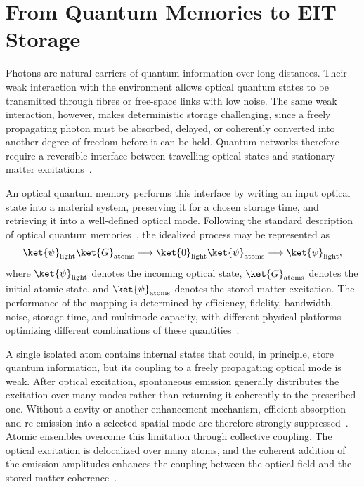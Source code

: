 \section{From Quantum Memories to EIT Storage}
\label{sec:from_quantum_memories_to_eit}

Photons are natural carriers of quantum information over long distances. Their weak interaction with the environment allows optical quantum states to be transmitted through fibres or free-space links with low noise. The same weak interaction, however, makes deterministic storage challenging, since a freely propagating photon must be absorbed, delayed, or coherently converted into another degree of freedom before it can be held. Quantum networks therefore require a reversible interface between travelling optical states and stationary matter excitations~\cite{AWAVQMitCoSR_Rodriguez_,Oqmboeit_MaEtAl_2017}.

An optical quantum memory performs this interface by writing an input optical state into a material system, preserving it for a chosen storage time, and retrieving it into a well-defined optical mode. Following the standard description of optical quantum memories~\cite{AWAVQMitCoSR_Rodriguez_,Oqmboeit_MaEtAl_2017}, the idealized process may be represented as
\begin{equation}
    \ket{\psi}_{\mathrm{light}}
    \ket{G}_{\mathrm{atoms}}
    \longrightarrow
    \ket{0}_{\mathrm{light}}
    \ket{\psi}_{\mathrm{atoms}}
    \longrightarrow
    \ket{\psi}_{\mathrm{light}},
    \label{eq:quantum_memory_mapping}
\end{equation}
where $\ket{\psi}_{\mathrm{light}}$ denotes the incoming optical state, $\ket{G}_{\mathrm{atoms}}$ denotes the initial atomic state, and $\ket{\psi}_{\mathrm{atoms}}$ denotes the stored matter excitation. The performance of the mapping is determined by efficiency, fidelity, bandwidth, noise, storage time, and multimode capacity, with different physical platforms optimizing different combinations of these quantities~\cite{AWAVQMitCoSR_Rodriguez_,Oqmboeit_MaEtAl_2017}.

A single isolated atom contains internal states that could, in principle, store quantum information, but its coupling to a freely propagating optical mode is weak. After optical excitation, spontaneous emission generally distributes the excitation over many modes rather than returning it coherently to the prescribed one. Without a cavity or another enhancement mechanism, efficient absorption and re-emission into a selected spatial mode are therefore strongly suppressed~\cite{AWAVQMitCoSR_Rodriguez_}. Atomic ensembles overcome this limitation through collective coupling. The optical excitation is delocalized over many atoms, and the coherent addition of the emission amplitudes enhances the coupling between the optical field and the stored matter coherence~\cite{AWAVQMitCoSR_Rodriguez_,Oqmboeit_MaEtAl_2017}.

